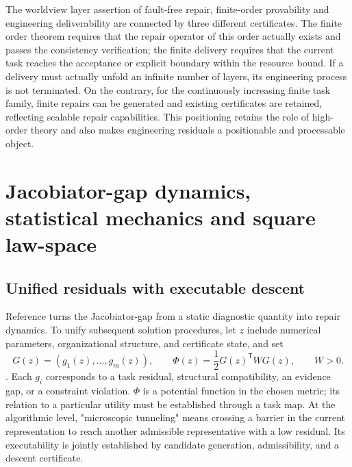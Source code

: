 \documentclass[11pt,a4paper]{article}
\theoremstyle{plain}
\theoremstyle{definition}
\theoremstyle{remark}
\begin{document}
\begin{CJK*}
The worldview layer assertion of fault-free repair, finite-order provability and engineering deliverability are connected by three different certificates. The finite order theorem requires that the repair operator of this order actually exists and passes the consistency verification; the finite delivery requires that the current task reaches the acceptance or explicit boundary within the resource bound. If a delivery must actually unfold an infinite number of layers, its engineering process is not terminated. On the contrary, for the continuously increasing finite task family, finite repairs can be generated and existing certificates are retained, reflecting scalable repair capabilities. This positioning retains the role of high-order theory and also makes engineering residuals a positionable and processable object.

\section { Jacobiator-gap dynamics, statistical mechanics and square law-space }\label{ss:dynamics}


\subsection { Unified residuals with executable descent }

Reference \cite{S17} turns the Jacobiator-gap from a static diagnostic quantity into repair dynamics. To unify subsequent solution procedures, let $z$ include numerical parameters, organizational structure, and certificate state, and set
\[
 G(z)=(g_1(z),\ldots,g_m(z)),\qquad
 \Phi(z)=\frac12G(z)^{\mathsf T}WG(z),\qquad W>0.
\].
Each $g_i$ corresponds to a task residual, structural compatibility, an evidence gap, or a constraint violation. $\Phi$ is a potential function in the chosen metric; its relation to a particular utility must be established through a task map. At the algorithmic level, "microscopic tunneling" means crossing a barrier in the current representation to reach another admissible representative with a low residual. Its executability is jointly established by candidate generation, admissibility, and a descent certificate.


\end{CJK*}
\end{document}
